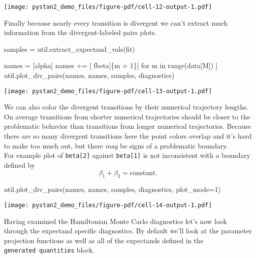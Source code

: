 \documentclass[
  letterpaper,
  DIV=11,
  numbers=noendperiod]{scrartcl}
\newenvironment{Shaded}{\begin{snugshade}}{\end{snugshade}}
\newcommand{\BuiltInTok}[1]{\textcolor[rgb]{0.00,0.23,0.31}{#1}}
\newcommand{\ControlFlowTok}[1]{\textcolor[rgb]{0.00,0.23,0.31}{#1}}
\newcommand{\DecValTok}[1]{\textcolor[rgb]{0.68,0.00,0.00}{#1}}
\newcommand{\KeywordTok}[1]{\textcolor[rgb]{0.00,0.23,0.31}{#1}}
\newcommand{\NormalTok}[1]{\textcolor[rgb]{0.00,0.23,0.31}{#1}}
\newcommand{\OperatorTok}[1]{\textcolor[rgb]{0.37,0.37,0.37}{#1}}
\newcommand{\SpecialCharTok}[1]{\textcolor[rgb]{0.37,0.37,0.37}{#1}}
\newcommand{\SpecialStringTok}[1]{\textcolor[rgb]{0.13,0.47,0.30}{#1}}
\newcommand{\StringTok}[1]{\textcolor[rgb]{0.13,0.47,0.30}{#1}}
\begin{document}
\texttt{[image: pystan2\_demo\_files/figure-pdf/cell-12-output-1.pdf]}

Finally because nearly every transition is divergent we can't extract
much information from the divergent-labeled pairs plots.

\begin{Shaded}
\begin{Highlighting}[]
\NormalTok{samples }\OperatorTok{=}\NormalTok{ util.extract\_expectand\_vals(fit)}

\NormalTok{names }\OperatorTok{=}\NormalTok{ [}\StringTok{\textquotesingle{}alpha\textquotesingle{}}\NormalTok{]}
\NormalTok{names }\OperatorTok{+=}\NormalTok{ [ }\SpecialStringTok{f\textquotesingle{}beta[}\SpecialCharTok{\{}\NormalTok{m }\OperatorTok{+} \DecValTok{1}\SpecialCharTok{\}}\SpecialStringTok{]\textquotesingle{}} \ControlFlowTok{for}\NormalTok{ m }\KeywordTok{in} \BuiltInTok{range}\NormalTok{(data[}\StringTok{\textquotesingle{}M\textquotesingle{}}\NormalTok{]) ]}
\NormalTok{util.plot\_div\_pairs(names, names, samples, diagnostics)}
\end{Highlighting}
\end{Shaded}

\texttt{[image: pystan2\_demo\_files/figure-pdf/cell-13-output-1.pdf]}

We can also color the divergent transitions by their numerical
trajectory lengths. On average transitions from shorter numerical
trajectories should be closer to the problematic behavior than
transitions from longer numerical trajectories. Because there are so
many divergent transitions here the point colors overlap and it's hard
to make too much out, but there \emph{may} be signs of a problematic
boundary.\\
For example plot of \texttt{beta{[}2{]}} against \texttt{beta{[}1{]}} is
not inconsistent with a boundary defined by \[
\beta_{1} + \beta_{2} = \mathrm{constant}.
\]

\begin{Shaded}
\begin{Highlighting}[]
\NormalTok{util.plot\_div\_pairs(names, names, samples, diagnostics, plot\_mode}\OperatorTok{=}\DecValTok{1}\NormalTok{)}
\end{Highlighting}
\end{Shaded}

\texttt{[image: pystan2\_demo\_files/figure-pdf/cell-14-output-1.pdf]}

Having examined the Hamiltonian Monte Carlo diagnostics let's now look
through the expectand specific diagnostics. By default we'll look at the
parameter projection functions as well as all of the expectands defined
in the \texttt{generated\ quantities} block.
\end{document}
